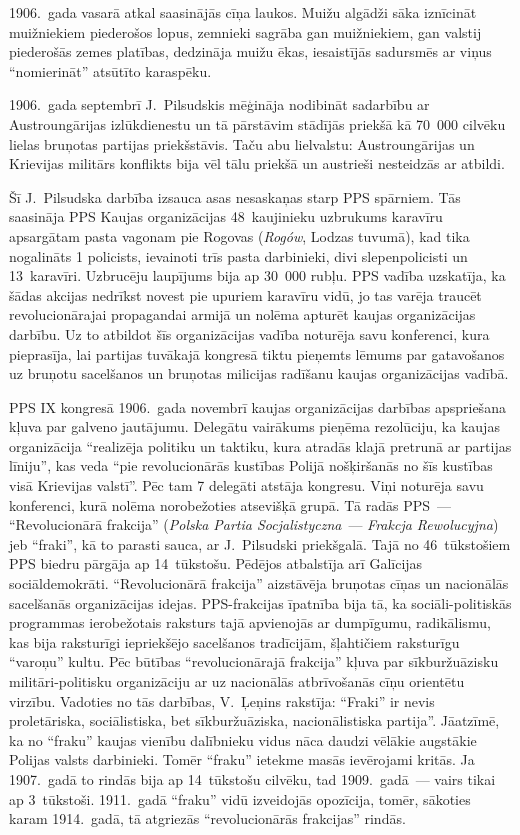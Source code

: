 \documentclass[twoside,a5paper,12pt,fleqn,openany]{extbook}
\newcommand{\pltxti}[1]{\textit{\textpolish{#1}}}
\begin{document}
1906.~gada vasarā atkal saasinājās cīņa laukos. Muižu algādži sāka iznīcināt muižniekiem piederošos lopus, zemnieki sagrāba gan muižniekiem, gan valstij piederošās zemes platības, dedzināja muižu ēkas, iesaistījās sadursmēs ar viņus ``nomierināt'' atsūtīto karaspēku.

1906.~gada septembrī J.~Pilsudskis mēģināja nodibināt sadarbību ar Austroungārijas izlūkdienestu un tā pārstāvim stādījās priekšā kā 70~000 cilvēku lielas bruņotas partijas priekšstāvis. Taču abu lielvalstu: Austroungārijas un Krievijas militārs konflikts bija vēl tālu priekšā un austrieši nesteidzās ar atbildi.

Šī J.~Pilsudska darbība izsauca asas nesaskaņas starp PPS spārniem. Tās saasināja PPS Kaujas organizācijas 48~kaujinieku uzbrukums karavīru apsargātam pasta vagonam pie Rogovas (\pltxti{Rogów}, Lodzas tuvumā), kad tika nogalināts 1 policists, ievainoti trīs pasta darbinieki, divi slepenpolicisti un 13~karavīri. Uzbrucēju laupījums bija ap 30~000 rubļu. PPS vadība uzskatīja, ka šādas akcijas nedrīkst novest pie upuriem karavīru vidū, jo tas varēja traucēt revolucionārajai propagandai armijā un nolēma apturēt kaujas organizācijas darbību. Uz to atbildot šīs organizācijas vadība noturēja savu konferenci, kura pieprasīja, lai partijas tuvākajā kongresā tiktu pieņemts lēmums par gatavošanos uz bruņotu sacelšanos un bruņotas milicijas radīšanu kaujas organizācijas vadībā.

PPS IX kongresā 1906.~gada novembrī kaujas organizācijas darbības apspriešana kļuva par galveno jautājumu. Delegātu vairākums pieņēma rezolūciju, ka kaujas organizācija ``realizēja politiku un taktiku, kura atradās klajā pretrunā ar partijas līniju'', kas veda ``pie revolucionārās kustības Polijā nošķiršanās no šīs kustības visā Krievijas valstī''. Pēc tam 7 delegāti atstāja kongresu. Viņi noturēja savu konferenci, kurā nolēma norobežoties atsevišķā grupā. Tā radās PPS~--- ``Revolucionārā frakcija'' (\pltxti{Polska Partia Socjalistyczna}~--- \pltxti{Frakcja Rewolucyjna}) jeb ``fraki'', kā to parasti sauca, ar J.~Pilsudski priekšgalā. Tajā no 46~tūkstošiem PPS biedru pārgāja ap 14~tūkstošu. Pēdējos atbalstīja arī Galīcijas sociāldemokrāti. ``Revolucionārā frakcija'' aizstāvēja bruņotas cīņas un nacionālās sacelšanās organizācijas idejas. PPS-frakcijas īpatnība bija tā, ka sociāli-politiskās programmas ierobežotais raksturs tajā apvienojās ar dumpīgumu, radikālismu, kas bija raksturīgi iepriekšējo sacelšanos tradīcijām, šļahtičiem raksturīgu ``varoņu'' kultu. Pēc būtības ``revolucionārajā frakcija'' kļuva par sīkburžuāzisku militāri-politisku organizāciju ar uz nacionālās atbrīvošanās cīņu orientētu virzību. Vadoties no tās darbības, V.~Ļeņins rakstīja: ``Fraki'' ir nevis proletāriska, sociālistiska, bet sīkburžuāziska, nacionālistiska partija''. Jāatzīmē, ka no ``fraku'' kaujas vienību dalībnieku vidus nāca daudzi vēlākie augstākie Polijas valsts darbinieki. Tomēr ``fraku'' ietekme masās ievērojami kritās. Ja 1907.~gadā to rindās bija ap 14~tūkstošu cilvēku, tad 1909.~gadā~--- vairs tikai ap 3~tūkstoši. 1911.~gadā ``fraku'' vidū izveidojās opozīcija, tomēr, sākoties karam 1914.~gadā, tā atgriezās ``revolucionārās frakcijas'' rindās.
\end{document}
